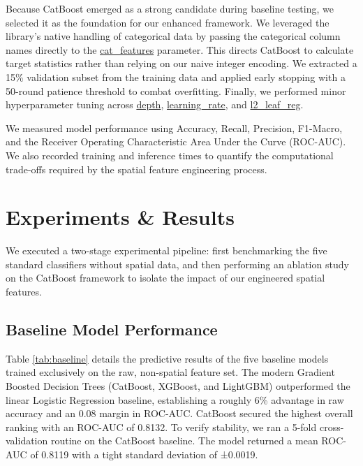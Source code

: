 \documentclass[runningheads]{llncs}
\begin{document}
Because CatBoost emerged as a strong candidate during baseline testing, we selected it as the foundation for our enhanced framework. We leveraged the library's native handling of categorical data by passing the categorical column names directly to the \url{cat_features} parameter. This directs CatBoost to calculate target statistics rather than relying on our naive integer encoding. We extracted a 15\% validation subset from the training data and applied early stopping with a 50-round patience threshold to combat overfitting. Finally, we performed minor hyperparameter tuning across \url{depth}, \url{learning_rate}, and \url{l2_leaf_reg}.

We measured model performance using Accuracy, Recall, Precision, F1-Macro, and the Receiver Operating Characteristic Area Under the Curve (ROC-AUC). We also recorded training and inference times to quantify the computational trade-offs required by the spatial feature engineering process.


\section{Experiments \& Results}
\label{sec:experiments}

We executed a two-stage experimental pipeline: first benchmarking the five standard classifiers without spatial data, and then performing an ablation study on the CatBoost framework to isolate the impact of our engineered spatial features.

\subsection{Baseline Model Performance}

Table \ref{tab:baseline} details the predictive results of the five baseline models trained exclusively on the raw, non-spatial feature set. The modern Gradient Boosted Decision Trees (CatBoost, XGBoost, and LightGBM) outperformed the linear Logistic Regression baseline, establishing a roughly 6\% advantage in raw accuracy and an 0.08 margin in ROC-AUC. CatBoost secured the highest overall ranking with an ROC-AUC of 0.8132. To verify stability, we ran a 5-fold cross-validation routine on the CatBoost baseline. The model returned a mean ROC-AUC of 0.8119 with a tight standard deviation of ±0.0019.
\end{document}

